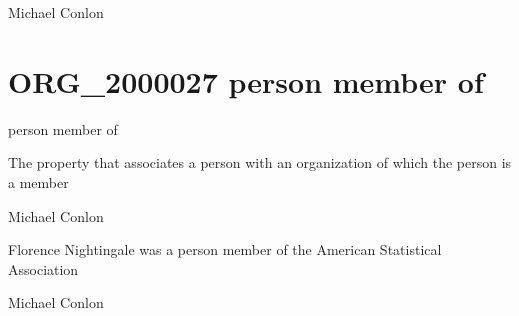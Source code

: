 \documentclass[letterpaper,10pt,english]{sphinxmanual}
\begin{document}
\begin{sphinxShadowBox}

\sphinxAtStartPar
Michael Conlon 
\end{sphinxShadowBox}
\begin{quote}
\label{\detokenize{doc-ORG_2000027:org-2000027}}\label{\detokenize{doc-ORG_2000027:person-member-of}}\label{\detokenize{doc-ORG_2000027:org-2000027}}
\ignorespaces \end{quote}


\section{ORG\_2000027 \sphinxhyphen{} person member of}
\label{\detokenize{doc-ORG_2000027:org-2000027-person-member-of}}\label{\detokenize{doc-ORG_2000027:index-0}}\label{\detokenize{doc-ORG_2000027::doc}}
\begin{sphinxShadowBox}

\sphinxAtStartPar
person member of
\end{sphinxShadowBox}

\begin{sphinxShadowBox}

\sphinxAtStartPar
The property that associates a person with an organization of which the person is a member
\end{sphinxShadowBox}

\begin{sphinxShadowBox}

\sphinxAtStartPar
Michael Conlon 
\end{sphinxShadowBox}

\begin{sphinxShadowBox}

\sphinxAtStartPar
Florence Nightingale was a person member of the American Statistical Association
\end{sphinxShadowBox}

\begin{sphinxShadowBox}

\sphinxAtStartPar
Michael Conlon 
\end{sphinxShadowBox}
\begin{quote}
\label{\detokenize{doc-RO_0000052:ro-0000052}}\label{\detokenize{doc-RO_0000052:inheres-in}}\label{\detokenize{doc-RO_0000052:ro-0000052}}
\ignorespaces \end{quote}
\end{document}
